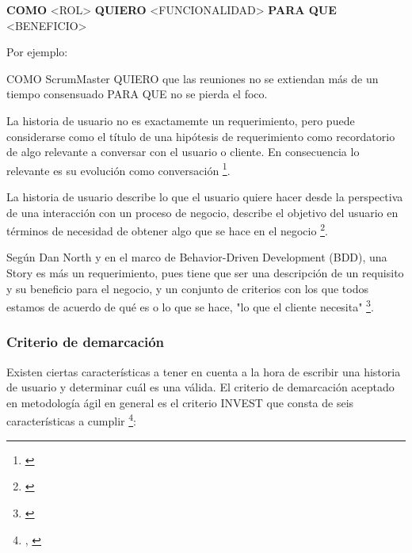 \textbf{COMO} <ROL> \textbf{QUIERO} <FUNCIONALIDAD> \textbf{PARA QUE} <BENEFICIO>

Por ejemplo:

COMO ScrumMaster QUIERO que las reuniones no se extiendan más de un tiempo consensuado PARA QUE no se pierda el foco.

La historia de usuario no es exactamemte un requerimiento, pero puede considerarse como el título de una hipótesis de requerimiento como recordatorio de algo relevante a conversar con el usuario o cliente. En consecuencia lo relevante es su evolución como conversación \footnote{\cite{UNTREF-2014}}.

La historia de usuario describe lo que el usuario quiere hacer desde la perspectiva de una interacción con un proceso de negocio, describe el objetivo del usuario en términos de necesidad de obtener algo que se hace en el negocio \footnote{\cite{Scott-Bellware-2008}}.

Según Dan North y en el marco de Behavior-Driven Development (BDD), una Story es más un requerimiento, pues tiene que ser una descripción de un requisito y su beneficio para el negocio, y un conjunto de criterios con los que todos estamos de acuerdo de qué es o lo que se hace, "lo que el cliente necesita" \footnote{\cite{Dan-North-2015}}. 

\subsubsection{Criterio de demarcación}

Existen ciertas características a tener en cuenta a la hora de escribir una historia de usuario y determinar cuál es una válida. El criterio de demarcación aceptado en metodología ágil en general es el criterio INVEST que consta de seis características a cumplir \footnote{\cite{UNTREF-2014}, \cite{Scrum-Alliance-2015}}:

